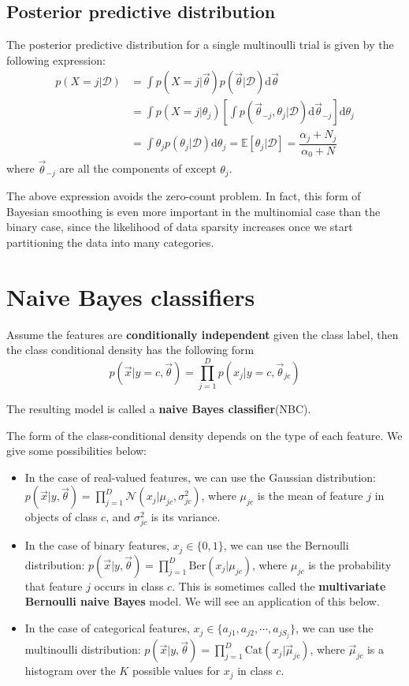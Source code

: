 \subsection{Posterior predictive distribution}
The posterior predictive distribution for a single multinoulli trial is given by the following expression:
\begin{align}
p(X=j|\mathcal{D})& =\int p(X=j|\vec{\theta})p(\vec{\theta}|\mathcal{D})\mathrm{d}\vec{\theta} \\
    & =\int p(X=j|\theta_j)\left[\int p(\vec{\theta}_{-j}, \theta_j|\mathcal{D})\mathrm{d}\vec{\theta}_{-j}\right]\mathrm{d}\theta_j \\
	& =\int \theta_jp(\theta_j|\mathcal{D})\mathrm{d}\theta_j=\mathbb{E}[\theta_j|\mathcal{D}]=\dfrac{\alpha_j+N_j}{\alpha_0+N}
\end{align}
where $\vec{\theta}_{-j}$ are all the components of \vec{\theta} except $\theta_j$.

The above expression avoids the zero-count problem. In fact, this form of Bayesian smoothing is even more important in the multinomial case than the binary case, since the likelihood of data sparsity increases once we start partitioning the data into many categories.


\section{Naive Bayes classifiers}
\label{sec:NBC}
Assume the features are \textbf{conditionally independent} given the class label, then the class conditional density has the following form
\begin{equation}
p(\vec{x}|y=c,\vec{\theta})=\prod\limits_{j=1}^D p(x_j|y=c,\vec{\theta}_{jc})
\end{equation}

The resulting model is called a \textbf{naive Bayes classifier}(NBC).

The form of the class-conditional density depends on the type of each feature. We give some possibilities below:
\begin{itemize}
\item{In the case of real-valued features, we can use the Gaussian distribution: $p(\vec{x}|y,\vec{\theta})=\prod_{j=1}^D \mathcal{N}(x_j|\mu_{jc},\sigma_{jc}^2)$, where $\mu_{jc}$ is the mean of feature $j$ in objects of class $c$, and $\sigma_{jc}^2$ is its variance.}
\item{In the case of binary features, $x_j \in \{0,1\}$, we can use the Bernoulli distribution: $p(\vec{x}|y,\vec{\theta})=\prod_{j=1}^D \text{Ber}(x_j|\mu_{jc})$, where $\mu_{jc}$ is the probability that feature $j$ occurs in class $c$. This is sometimes called the \textbf{multivariate Bernoulli naive Bayes} model. We will see an application of this below.}
\item{In the case of categorical features, $x_j \in \{a_{j1},a_{j2},\cdots, a_{jS_j}\}$, we can use the multinoulli distribution: $p(\vec{x}|y,\vec{\theta})=\prod_{j=1}^D \text{Cat}(x_j|\vec{\mu}_{jc})$, where $\vec{\mu}_{jc}$ is a histogram over the $K$ possible values for $x_j$ in class $c$.}
\end{itemize}

